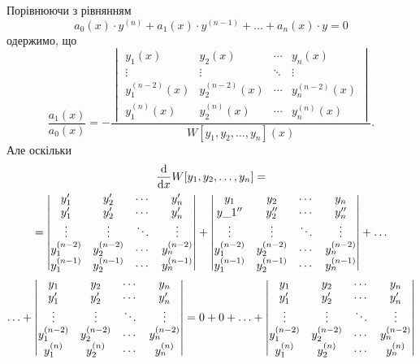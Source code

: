 Порівнюючи з рівнянням 
\begin{equation*}
	a_0(x) \cdot y^{(n)} + a_1(x) \cdot y^{(n - 1)} + \ldots + a_n(x) \cdot y = 0
\end{equation*}
одержимо, що
\begin{equation*}
	\frac{a_1(x)}{a_0(x)} = - \frac{\begin{vmatrix}
		y_1(x) & y_2(x) & \cdots & y_n(x) \\
		\vdots & \vdots & \ddots & \vdots \\
		y_1^{(n - 2)}(x) & y_2^{(n - 2)}(x) & \cdots & y_n^{(n - 2)}(x) \\
		y_1^{(n)}(x) & y_2^{(n)}(x) & \cdots & y_n^{(n)}(x)
	\end{vmatrix}}{W[y_1, y_2, \ldots, y_n](x)}.
\end{equation*}
Але оскільки
\begin{multline*}
	\frac{\mathop{}\!\mathrm{d}}{\mathop{}\!\mathrm{d} x} W[y_1, y_2, \ldots, y_n] = \\ = \begin{vmatrix}
		y_1' & y_2' & \cdots & y_n' \\
		y_1' & y_2' & \cdots & y_n' \\
		\vdots & \vdots & \ddots & \vdots \\
		y_1^{(n - 2)} & y_2^{(n - 2)} & \cdots & y_n^{(n - 2)} \\
		y_1^{(n - 1)} & y_2^{(n - 1)} & \cdots & y_n^{(n - 1)}
	\end{vmatrix} + \begin{vmatrix}
		y_1 & y_2 & \cdots & y_n \\
		y\_1'' & y_2'' & \cdots & y_n'' \\
		\vdots & \vdots & \ddots & \vdots \\
		y_1^{(n - 2)} & y_2^{(n - 2)} & \cdots & y_n^{(n - 2)} \\
		y_1^{(n - 1)} & y_2^{(n - 1)} & \cdots & y_n^{(n - 1)}
	\end{vmatrix} + \ldots \\ \ldots + \begin{vmatrix}
		y_1 & y_2 & \cdots & y_n \\
		y_1' & y_2' & \cdots & y_n' \\
		\vdots & \vdots & \ddots & \vdots \\
		y_1^{(n - 2)} & y_2^{(n - 2)} & \cdots & y_n^{(n - 2)} \\
		y_1^{(n)} & y_2^{(n)} & \cdots & y_n^{(n)}
	\end{vmatrix} = 0 + 0 + \ldots + \begin{vmatrix}
		y_1 & y_2 & \cdots & y_n \\
		y_1' & y_2' & \cdots & y_n' \\
		\vdots & \vdots & \ddots & \vdots \\
		y_1^{(n - 2)} & y_2^{(n - 2)} & \cdots & y_n^{(n - 2)}\\
		y_1^{(n)} & y_2^{(n)} & \cdots & y_n^{(n)}
	\end{vmatrix}
\end{multline*}   
